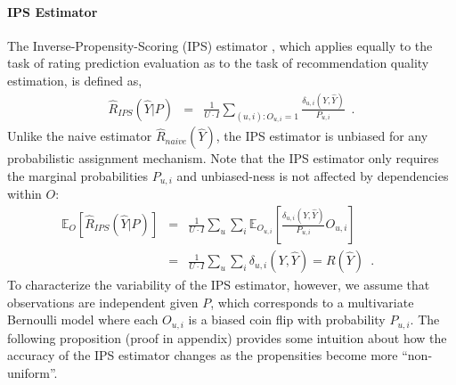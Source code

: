 \documentclass{article}
\def\E{{\mathbb{E}}}
\newcommand{\user}{u}                       %
\newcommand{\users}{U}                      %
\newcommand{\movie}{i}                      %
\newcommand{\movies}{I}                     %
\newcommand{\ytrue}{Y}                      %
\newcommand{\ypred}{\hat{Y}}                %
\newcommand{\loss}[3]{\delta_{#1}(#2,#3)}   %
\newcommand{\lossum}{\loss{\user,\movie}{\ytrue}{\ypred}}
\newcommand{\obs}{O}                        %
\newcommand{\obselem}[1]{\obs_{#1}}
\newcommand{\obsum}{\obselem{\user,\movie}}
\newcommand{\probobs}{P}                    %
\newcommand{\probobselem}[1]{\probobs_{#1}}
\newcommand{\probobsum}{\probobselem{\user,\movie}}
\newcommand{\risk}[1]{R(#1)}                %
\newcommand{\risky}{\risk{\ypred}}
\newcommand{\naiveest}[1]{\hat{R}_{naive}(#1)}     %
\newcommand{\naiveesty}{\naiveest{\ypred}}
\newcommand{\ipsest}[2]{\hat{R}_{IPS}(#1|#2)}      %
\newcommand{\ipsesty}{\ipsest{\ypred}{\probobs}}
\begin{document}
\paragraph{IPS Estimator}
The Inverse-Propensity-Scoring (IPS) estimator \cite{Thompson/12,rubin2002mnar,Imbens/Rubin/15}, which applies equally to the task of rating prediction evaluation as to the task of recommendation quality estimation, is defined as,
\begin{eqnarray}
\ipsesty %
         & = & \frac{1}{\users \!\cdot\! \movies}\!\!\!\!\sum_{(\user,\movie):\obsum=1}\!\!\!\! \frac{\lossum}{\probobsum}\label{eq:ips}\enspace.
\end{eqnarray}
Unlike the naive estimator $\naiveesty$, the IPS estimator is unbiased for any probabilistic assignment mechanism.
Note that the IPS estimator only requires the marginal probabilities $\probobsum$ and unbiased-ness is not affected by dependencies within $\obs$:
\vspace{-10mm}
\begin{eqnarray}
\E_\obs\!\left[\ipsesty\right] &\!\!\!\!=\!\!\!\!& %
 \frac{1}{\users \!\cdot\! \movies}\!\sum_\user \sum_\movie \mathbb{E}_{\obsum} \!\!\left[ \frac{\lossum}{\probobsum} \obsum\right]\nonumber \\
&\!\!\!\!=\!\!\!\!& \frac{1}{\users \!\cdot\! \movies}\!\sum_{\user} \sum_{\movie} \lossum = \risky \enspace . \:\:\:\:\:\:\:\:\:\:\label{eq:ipsunbiased} \nonumber
\end{eqnarray}
To characterize the variability of the IPS estimator, however, we assume that observations are independent given $\probobs$, which corresponds to a multivariate Bernoulli model where each $\obsum$ is a biased coin flip with probability $\probobsum$. The following proposition (proof in appendix) provides some intuition about how the accuracy of the IPS estimator changes as the propensities become more ``non-uniform''.
\end{document}
